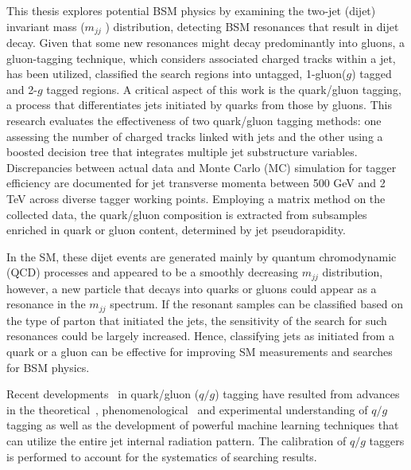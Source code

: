 \documentclass[UTF8,12pt]{ctexart}
\numberwithin{equation}{section}
\def\mjj{$m_{jj}$ }
\begin{document}
This thesis explores potential BSM physics by examining the two-jet (dijet) invariant mass (\mjj) distribution, detecting BSM resonances that result in dijet decay. Given that some new resonances might decay predominantly into gluons, a gluon-tagging technique, which considers associated charged tracks within a jet, has been utilized, classified the search regions into untagged, 1-gluon($g$) tagged and 2-$g$ tagged regions. A critical aspect of this work is the quark/gluon tagging, a process that differentiates jets initiated by quarks from those by gluons. This research evaluates the effectiveness of two quark/gluon tagging methods: one assessing the number of charged tracks linked with jets and the other using a boosted decision tree that integrates multiple jet substructure variables. Discrepancies between actual data and Monte Carlo (MC) simulation for tagger efficiency are documented for jet transverse momenta between 500 GeV and 2 TeV across diverse tagger working points. Employing a matrix method on the collected data, the quark/gluon composition is extracted from subsamples enriched in quark or gluon content, determined by jet pseudorapidity.

In the SM, these dijet events are generated mainly by quantum chromodynamic (QCD) processes and appeared to be a smoothly decreasing \mjj distribution, however, a new particle that decays into quarks or gluons could appear as a resonance in the \mjj spectrum. If the resonant samples can be classified based on the type of parton that initiated the jets, the sensitivity of the search for such resonances could be largely increased. Hence, classifying jets as initiated from a quark or a gluon can be effective for improving SM measurements and searches for BSM physics. 

Recent developments~\cite{CMS:2021iwu,ref22,CMS:2017yer,CMS:2013kfv,CMS:2017pcy,PhysRevD.98.092014,CMS:2018vzn,Altheimer:2012mn,Andersen:2016qtm,Larkoski:2014pca,CDF:2005prv,OPAL:1999jkz,CLEO:2007tqf,DELPHI:1999gah,ZEUS:2004gcp,ref24,Komiske:2016rsd} in quark/gluon ($q/g$) tagging have resulted from advances in the theoretical~\cite{ref16}, phenomenological~\cite{ref17, ref18, Gras:2017jty, Komiske:2018vkc} and experimental understanding of $q/g$ tagging as well as the development of powerful machine learning techniques that can utilize the entire jet internal radiation pattern. The calibration of $q/g$ taggers is performed to account for the systematics of searching results. 
\end{document}
